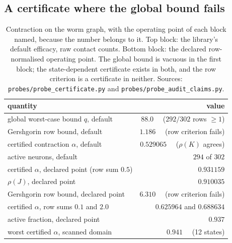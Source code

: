 \documentclass[11pt]{article}
\theoremstyle{remark}
\begin{document}
\subsection{A certificate where the global bound fails}

\begin{table}[t]
\centering
\small
\caption{Contraction on the worm graph, with the operating point of each block named, because the
number belongs to it. Top block: the library's default efficacy, raw contact counts. Bottom block: the
declared row-normalised operating point. The global bound is vacuous in the first block; the
state-dependent certificate exists in both, and the row criterion is a certificate in neither.
Sources: \texttt{probes/probe\_certificate.py} and \texttt{probes/probe\_audit\_claims.py}.}
\label{tab:cert}
\begin{tabular}{@{}lr@{}}
\toprule
quantity & value \\
\midrule
global worst-case bound $q$, default & $88.0$ \ \ ($292/302$ rows $\ge 1$) \\
Gershgorin row bound, default & $1.186$ \ \ (row criterion fails) \\
certified contraction $\alpha$, default & $0.529065$ \ \ ($\rho(K)$ agrees) \\
active neurons, default & $294$ of $302$ \\
\midrule
certified $\alpha$, declared point (row sum $0.5$) & $0.931159$ \\
$\rho(J)$, declared point & $0.910035$ \\
Gershgorin row bound, declared point & $6.310$ \ \ (row criterion fails) \\
certified $\alpha$, row sums $0.1$ and $2.0$ & $0.625964$ and $0.688634$ \\
active fraction, declared point & $0.937$ \\
\midrule
worst certified $\alpha$, scanned domain & $0.941$ \ \ (12 states) \\
\bottomrule
\end{tabular}
\end{table}
\end{document}
